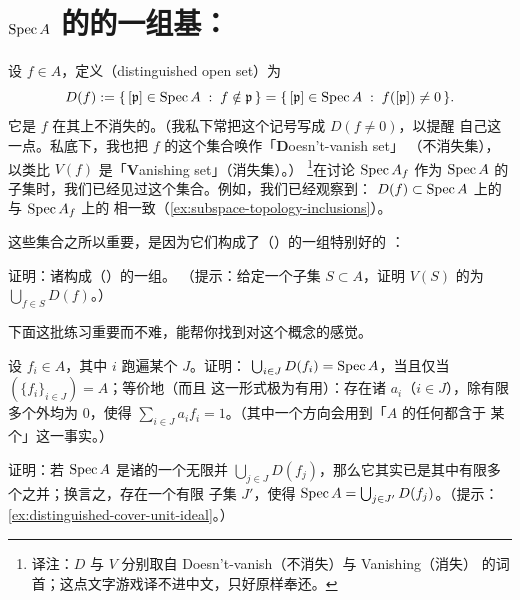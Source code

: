 
\section{$\operatorname{Spec} A$ 的\trZariskiTopology{}的一组基：\trDistinguishedOpen}

设 $f\in A$，定义\textbf{\trDistinguishedOpen}（distinguished open set）为
\[
D(f):=\{\, [\mathfrak{p}]\in\operatorname{Spec} A \;:\; f\notin\mathfrak{p} \,\}
=\{\, [\mathfrak{p}]\in\operatorname{Spec} A \;:\; f([\mathfrak{p}])\neq 0 \,\}.
\]
它是 $f$ 在其上不消失的\trLocus。（我私下常把这个记号写成 $D(f\neq 0)$，以提醒%
自己这一点。私底下，我也把 $f$ 的这个集合唤作「\textbf{D}oesn't-vanish set」%
（不消失集），以类比 $V(f)$ 是「\textbf{V}anishing set」（消失集）。）%
\footnote{译注：$D$ 与 $V$ 分别取自 Doesn't-vanish（不消失）与 Vanishing（消失）
的词首；这点文字游戏译不进中文，只好原样奉还。}在讨论 $\operatorname{Spec} A_f$ 作为 $\operatorname{Spec} A$
的子集时，我们已经见过这个集合。例如，我们已经观察到：\trDistinguishedOpen{}
$D(f)\subset\operatorname{Spec} A$ 上的\trZariskiTopology{}与 $\operatorname{Spec} A_f$ 上的%
\trZariskiTopology{}相一致（\cref{ex:subspace-topology-inclusions}）。

这些集合之所以重要，是因为它们构成了（\trZariski）\trTopology{}的一组特别好的%
\trBase：

\begin{exercise}[容易的练习]\label{ex:distinguished-opens-base}
证明：诸\trDistinguishedOpen{}构成（\trZariski）\trTopology{}的一组\trBase。
（提示：给定一个子集 $S\subset A$，证明 $V(S)$ 的\trComplement{}为 $\bigcup_{f\in S}D(f)$。）
\end{exercise}

下面这批练习重要而不难，能帮你找到对这个概念的感觉。

\begin{exercise}[巧妙练习]\label{ex:distinguished-cover-unit-ideal}
设 $f_i\in A$，其中 $i$ 跑遍某个\trIndexSet{} $J$。证明：%
$\bigcup_{i\in J}D(f_i)=\operatorname{Spec} A$，当且仅当 $(\{f_i\}_{i\in J})=A$；等价地（而且
这一形式极为有用）：存在诸 $a_i$（$i\in J$），除有限多个外均为 $0$，使得
$\sum_{i\in J}a_if_i=1$。（其中一个方向会用到「$A$ 的任何\trProperIdeal{}都含于
某个\trMaximalIdeal」这一事实。）
\end{exercise}

\begin{exercise}\label{ex:distinguished-cover-finite-subcover}
证明：若 $\operatorname{Spec} A$ 是诸\trDistinguishedOpen{}的一个无限并%
$\bigcup_{j\in J}D(f_j)$，那么它其实已是其中有限多个之并；换言之，存在一个有限
子集 $J'$，使得 $\operatorname{Spec} A=\bigcup_{j\in J'}D(f_j)$。（提示：%
\cref{ex:distinguished-cover-unit-ideal}。）
\end{exercise}

